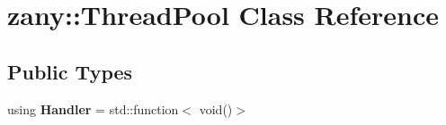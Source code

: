 \hypertarget{classzany_1_1_thread_pool}{}\section{zany\+:\+:Thread\+Pool Class Reference}
\label{classzany_1_1_thread_pool}
\subsection*{Public Types}
\begin{DoxyCompactItemize}
\item 
\mbox{\label{classzany_1_1_thread_pool_aa546aef54ee4f1fc6dff64cd606141e5}} 
using {\bfseries Handler} = std\+::function$<$ void()$>$
\end{DoxyCompactItemize}
